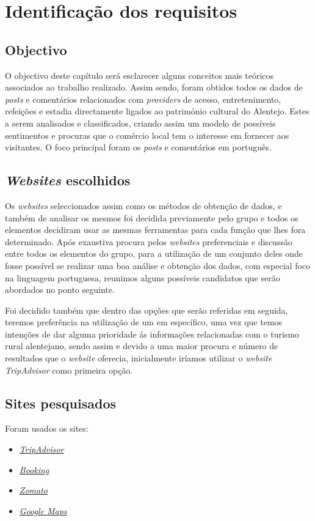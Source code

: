 \chapter{Identificação dos requisitos}
\label{cap2}
\section{Objectivo}

O objectivo deste capítulo será esclarecer alguns conceitos mais teóricos associados ao trabalho realizado. 
Assim sendo, foram obtidos todos os dados de \textit{posts} e comentários relacionados com \textit{providers} de acesso, entretenimento, refeições e estadia directamente ligados ao património cultural do Alentejo. Estes a serem analisados e classificados, criando assim um modelo de possíveis sentimentos e procuras que o comércio local tem o interesse em fornecer aos visitantes. O foco principal foram os \textit{posts} e comentários em português.

\section{\textit{Websites} escolhidos}

Os \textit{websites} seleccionados assim como os métodos de obtenção de dados, e também de analisar os mesmos foi decidida previamente pelo grupo e todos os elementos decidiram usar as mesmas ferramentas para cada função que lhes fora determinado.
Após exaustiva procura pelos \textit{websites} preferenciais e discussão entre todos os elementos do grupo, para a utilização de um conjunto deles onde fosse possível se realizar uma boa análise e obtenção dos dados, com especial foco na linguagem portuguesa, reunimos alguns possíveis candidatos que serão abordados no ponto seguinte.

Foi decidido também que dentro das opções que serão referidas em seguida, teremos preferência na utilização de um em específico, uma vez que temos intenções de dar alguma prioridade ás informações relacionadas com o turismo rural alentejano, sendo assim e devido a uma maior procura e número de resultados que o \textit{website} oferecia, inicialmente iríamos utilizar o \textit{website TripAdvisor} como primeira opção.

\newpage
\section{Sites pesquisados}

Foram usados os sites:
\begin{itemize}
  \setlength\itemsep{0.05em}
  \item \textit{\href{https://www.tripadvisor.com/}{TripAdvisor}}
  \item \textit{\href{https://www.booking.com/}{Booking}}
  \item \textit{\href{https://www.zomato.com/}{Zomato}}
  \item \textit{\href{https://developers.google.com/maps}{Google Maps}}
\end{itemize}

